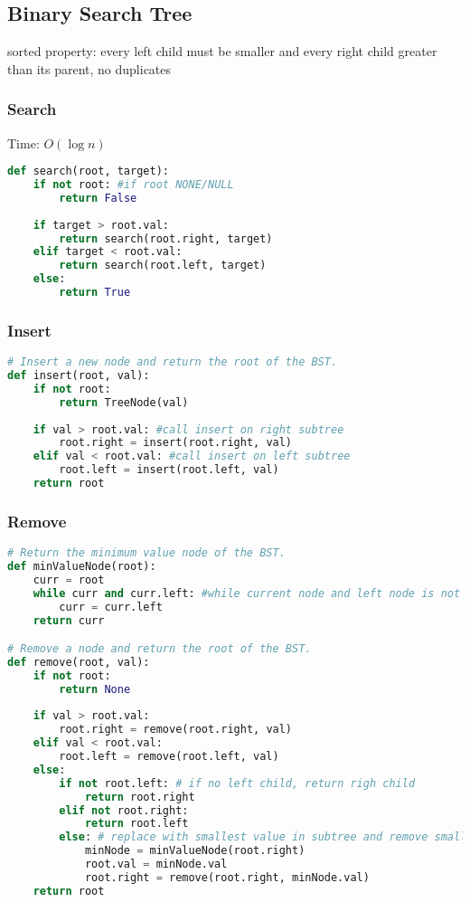 \documentclass[english, threecolumn]{latex4ei/latex4ei_sheet}
\begin{document}
\begin{sectionbox}
\subsection{Binary Search Tree}
sorted property: every left child must be smaller and every right child greater than its parent, no duplicates

\subsubsection{Search}
Time: $O(\log n)$
\begin{lstlisting}[language=python, gobble=0]
def search(root, target):
    if not root: #if root NONE/NULL
        return False
    
    if target > root.val:
        return search(root.right, target)
    elif target < root.val:
        return search(root.left, target)
    else:
        return True
\end{lstlisting}
\end{sectionbox}

\begin{sectionbox}
\subsubsection{Insert}
\begin{lstlisting}[language=python, gobble=0]
# Insert a new node and return the root of the BST.
def insert(root, val):
    if not root:
        return TreeNode(val)
    
    if val > root.val: #call insert on right subtree
        root.right = insert(root.right, val)
    elif val < root.val: #call insert on left subtree
        root.left = insert(root.left, val)
    return root
\end{lstlisting}

\subsubsection{Remove}
\begin{lstlisting}[language=python, gobble=0]
# Return the minimum value node of the BST.
def minValueNode(root):
    curr = root
    while curr and curr.left: #while current node and left node is not null
        curr = curr.left
    return curr

# Remove a node and return the root of the BST.
def remove(root, val):
    if not root:
        return None
    
    if val > root.val:
        root.right = remove(root.right, val)
    elif val < root.val:
        root.left = remove(root.left, val)
    else:
        if not root.left: # if no left child, return righ child
            return root.right
        elif not root.right:
            return root.left
        else: # replace with smallest value in subtree and remove smallest value in subtree
            minNode = minValueNode(root.right)
            root.val = minNode.val
            root.right = remove(root.right, minNode.val)
    return root
\end{lstlisting}
\end{sectionbox}
\end{document}
